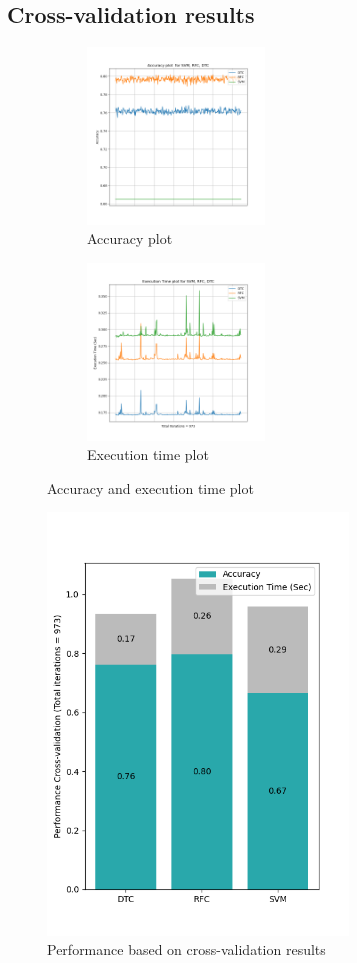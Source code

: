 \documentclass[conference]{IEEEtran}
\begin{document}
 \subsection{Cross-validation results}

		\begin{figure}[H]%
			\centering
			\begin{subfigure}[t]{4cm}
				\centerline{\includegraphics[width=4.7cm,scale=1]{Accuracy Plot.png}}
				\caption{Accuracy plot}
				\label{Accuracy Plot}
			\end{subfigure}\hfil%
			\begin{subfigure}[t]{4cm}
				\centerline{\includegraphics[width=4.7cm,scale=1]{Execution Time Plot.png}}
				\caption{Execution time plot}
				\label{Execution Time Plot}
			\end{subfigure}
		\caption{Accuracy and execution time plot}
		\label{Accuracy and Execution Time Plot}
		\end{figure}	
	\begin{figure}[H]
	\centerline{\includegraphics[width=80mm,scale=1]{Performance_CV.png}}
	\caption{Performance based on cross-validation results}
	\label{Performance_CV}
	\end{figure}	
\end{document}
